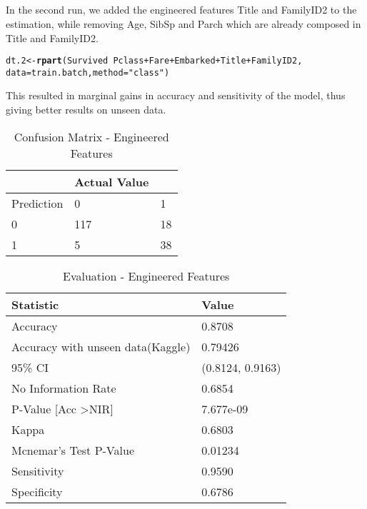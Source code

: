 \documentclass[a4paper,10pt]{report}\usepackage[]{graphicx}\usepackage[]{color}
\makeatletter
\newcommand{\hlstr}[1]{\textcolor[rgb]{0.192,0.494,0.8}{#1}}%
\newcommand{\hlopt}[1]{\textcolor[rgb]{0,0,0}{#1}}%
\newcommand{\hlstd}[1]{\textcolor[rgb]{0.345,0.345,0.345}{#1}}%
\newcommand{\hlkwb}[1]{\textcolor[rgb]{0.69,0.353,0.396}{#1}}%
\newcommand{\hlkwc}[1]{\textcolor[rgb]{0.333,0.667,0.333}{#1}}%
\newcommand{\hlkwd}[1]{\textcolor[rgb]{0.737,0.353,0.396}{\textbf{#1}}}%
\newenvironment{kframe}{%
 \def\at@end@of@kframe{}%
 \ifinner\ifhmode%
  \def\at@end@of@kframe{\end{minipage}}%
  \begin{minipage}{\columnwidth}%
 \fi\fi%
 \def\FrameCommand##1{\hskip\@totalleftmargin \hskip-\fboxsep
 \colorbox{shadecolor}{##1}\hskip-\fboxsep
     \hskip-\linewidth \hskip-\@totalleftmargin \hskip\columnwidth}%
 \MakeFramed {\advance\hsize-\width
   \@totalleftmargin\z@ \linewidth\hsize
   \@setminipage}}%
 {\par\unskip\endMakeFramed%
 \at@end@of@kframe}
\newenvironment{knitrout}{}{} %
\makeatother
\begin{document}
\subsection{}
In the second run, we added the engineered features Title and FamilyID2 to the estimation, while removing Age, SibSp and Parch which are already composed in Title and FamilyID2.
\begin{knitrout}
\color{fgcolor}\begin{kframe}
\begin{alltt}
\hlstd{dt.2} \hlkwb{<-} \hlkwd{rpart}\hlstd{(Survived} \hlopt{~} \hlstd{Pclass} \hlopt{+} \hlstd{Fare} \hlopt{+} \hlstd{Embarked} \hlopt{+} \hlstd{Title} \hlopt{+} \hlstd{FamilyID2,}
    \hlkwc{data} \hlstd{= train.batch,} \hlkwc{method} \hlstd{=} \hlstr{"class"}\hlstd{)}
\end{alltt}
\end{kframe}
\end{knitrout}
This resulted in marginal gains in accuracy and sensitivity of the model, thus giving better results on unseen data.

\begin{table}
    \begin{tabular}{|l|l|l|}
    \hline
    ~          & Actual Value  & ~  \\ \hline
    Prediction & 0             & 1  \\ \hline
    0          & 117           & 18 \\
    1          & 5             & 38 \\ \hline
    \end{tabular}
    \caption{Confusion Matrix - Engineered Features}
\end{table}

\begin{table}
    \begin{tabular}{|l|l|}
    \hline
    Statistic              & Value           \\ \hline
    Accuracy               & 0.8708          \\
    Accuracy with unseen data(Kaggle)               & 0.79426 \\ 
    95\% CI                & (0.8124, 0.9163) \\
    No Information Rate    & 0.6854          \\
    P-Value [Acc \textgreater NIR]    &  7.677e-09      \\
    Kappa                  &  0.6803         \\
    Mcnemar's Test P-Value & 0.01234          \\
    Sensitivity            &  0.9590         \\
    Specificity            & 0.6786          \\ \hline
    \end{tabular}
    \caption{Evaluation - Engineered Features}
\end{table}
\end{document}
